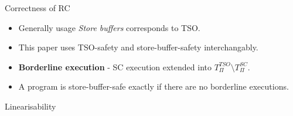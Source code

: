 \documentclass[9pt]{beamer}
\begin{document}
\begin{frame}{Correctness of RC~\cite{Burckhardt2008}}
\begin{itemize}
\item Generally usage {\em Store buffers} corresponds to TSO.
\item This paper uses TSO-safety and store-buffer-safety interchangably.
\item \textbf{Borderline execution} - SC execution extended into $T_{\Pi}^{TSO} \setminus  T_{\Pi}^{SC}$.
\item A program is store-buffer-safe exactly if there are no borderline executions.
\end{itemize}
\end{frame}


\begin{frame}{Linearisability}
\end{frame}




\footnotesize{


}
\end{document}
